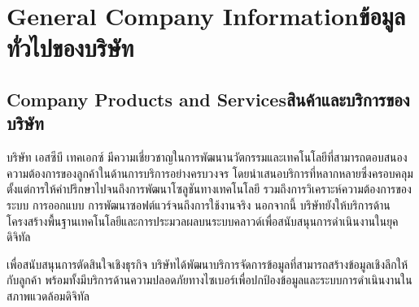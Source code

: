 \chapter{\ifenglish General Company Information\else ข้อมูลทั่วไปของบริษัท\fi}

\section{\ifenglish Company Products and Services\else สินค้าและบริการของบริษัท \fi}
บริษัท เอสซีบี เทคเอกซ์ มีความเชี่ยวชาญในการพัฒนานวัตกรรมและเทคโนโลยีที่สามารถตอบสนองความต้องการของลูกค้าในด้านการบริการอย่างครบวงจร โดยนำเสนอบริการที่หลากหลายซึ่งครอบคลุมตั้งแต่การให้คำปรึกษาไปจนถึงการพัฒนาโซลูชันทางเทคโนโลยี รวมถึงการวิเคราะห์ความต้องการของระบบ การออกแบบ การพัฒนาซอฟต์แวร์จนถึงการใช้งานจริง นอกจากนี้ บริษัทยังให้บริการด้านโครงสร้างพื้นฐานเทคโนโลยีและการประมวลผลบนระบบคลาวด์เพื่อสนับสนุนการดำเนินงานในยุคดิจิทัล

เพื่อสนับสนุนการตัดสินใจเชิงธุรกิจ บริษัทได้พัฒนาบริการจัดการข้อมูลที่สามารถสร้างข้อมูลเชิงลึกให้กับลูกค้า พร้อมทั้งมีบริการด้านความปลอดภัยทางไซเบอร์เพื่อปกป้องข้อมูลและระบบการดำเนินงานในสภาพแวดล้อมดิจิทัล


